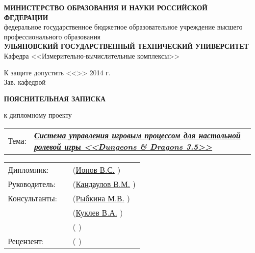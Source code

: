 \begin{titlepage}



\small
\begin{center}

\MakeTextUppercase{\textbf{министерство образования и науки российской федерации}}\\
федеральное государственное бюджетное образовательное учреждение высшего профессионального образования\\
\MakeTextUppercase{\textbf{ульяновский государственный технический университет}}\\[0.7cm]

Кафедра <<Измерительно-вычислительные комплексы>>\\[0.7cm]

\begin{flushright}

К защите допустить <<\underline{\hspace{1cm}}>>\underline{\hspace{2.5cm}} 2014 г.\\
Зав. кафедрой \underline{\hspace{3.5cm}}

\end{flushright}

\vspace{1.5cm}

\LARGE

\textbf{ПОЯСНИТЕЛЬНАЯ ЗАПИСКА}

\Large

к дипломному проекту\\[0.7cm]

\normalsize

\begin{tabular}{p{1cm} p{13.5cm}}
Тема: & \textbf{\textit{\uline{Система управления игровым процессом для настольной ролевой игры <<Dungeons \& Dragons 3.5>>\hfill}}}
\end{tabular}

\vspace{2cm}

\begin{tabular}{m{3cm} m{6cm} m{5cm}}
    Дипломник:    & \uline{\hfill} & (\uline{Ионов В.С.\hfill}     )  \\[0.5cm]
    Руководитель: & \uline{\hfill} & (\uline{Кандаулов В.М.\hfill} )  \\[0.5cm]
    Консультанты: & \uline{\hfill} & (\uline{Рыбкина М.В.\hfill}   )  \\[0.5cm]
                  & \uline{\hfill} & (\uline{Куклев В.А.\hfill}    )  \\[0.5cm]
                  & \uline{\hfill} & (\uline{\hfill}               )  \\[0.5cm]
    Рецензент:    & \uline{\hfill} & (\uline{\hfill}               )  \\
\end{tabular}


\end{center}
\end{titlepage}
